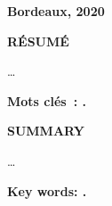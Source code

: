 {}
\cnam

\begin{large}\fulltitle\end{large}

\textbf{\goal}

\textbf{Bordeaux, 2020}

\hr

\textbf{RÉSUMÉ}

…

\textbf{Mots clés : .}

\hr

\textbf{SUMMARY}

…

\textbf{Key words: .}

\thispagestyle{empty}
\pagebreak
